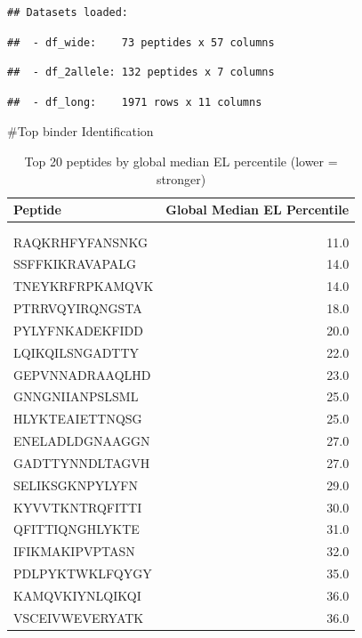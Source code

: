 \documentclass[
]{article}
\begin{document}
\begin{verbatim}
## Datasets loaded:
\end{verbatim}

\begin{verbatim}
##  - df_wide:    73 peptides x 57 columns
\end{verbatim}

\begin{verbatim}
##  - df_2allele: 132 peptides x 7 columns
\end{verbatim}

\begin{verbatim}
##  - df_long:    1971 rows x 11 columns
\end{verbatim}

\#Top binder Identification

\begin{longtable}[t]{lr}
\caption{\label{tab:binder Identification}Top 20 peptides by global median EL percentile (lower = stronger)}\\
\toprule
Peptide & Global Median EL Percentile\\
\midrule
\cellcolor[HTML]{fff3cd}{TPTYHVDPTGAYIQP} & \cellcolor[HTML]{fff3cd}{5.6}\\
\cellcolor[HTML]{fff3cd}{LFQYGYIPIENELAD} & \cellcolor[HTML]{fff3cd}{6.0}\\
RAQKRHFYFANSNKG & 11.0\\
SSFFKIKRAVAPALG & 14.0\\
TNEYKRFRPKAMQVK & 14.0\\
\addlinespace
PTRRVQYIRQNGSTA & 18.0\\
PYLYFNKADEKFIDD & 20.0\\
LQIKQILSNGADTTY & 22.0\\
GEPVNNADRAAQLHD & 23.0\\
GNNGNIIANPSLSML & 25.0\\
\addlinespace
HLYKTEAIETTNQSG & 25.0\\
ENELADLDGNAAGGN & 27.0\\
GADTTYNNDLTAGVH & 27.0\\
SELIKSGKNPYLYFN & 29.0\\
KYVVTKNTRQFITTI & 30.0\\
\addlinespace
QFITTIQNGHLYKTE & 31.0\\
IFIKMAKIPVPTASN & 32.0\\
PDLPYKTWKLFQYGY & 35.0\\
KAMQVKIYNLQIKQI & 36.0\\
VSCEIVWEVERYATK & 36.0\\
\bottomrule
\end{longtable}
\end{document}
